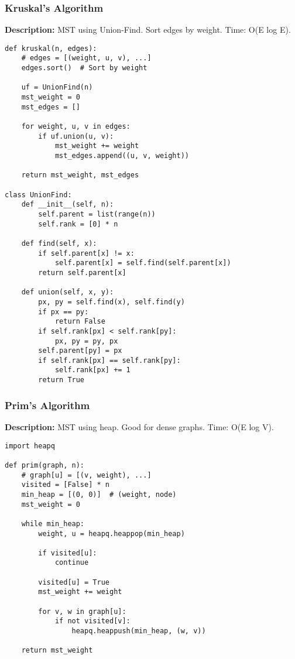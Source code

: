 \subsubsection{Kruskal's Algorithm}
\textbf{Description:} MST using Union-Find. Sort edges by weight. Time: O(E log E).

\begin{lstlisting}
def kruskal(n, edges):
    # edges = [(weight, u, v), ...]
    edges.sort()  # Sort by weight
    
    uf = UnionFind(n)
    mst_weight = 0
    mst_edges = []
    
    for weight, u, v in edges:
        if uf.union(u, v):
            mst_weight += weight
            mst_edges.append((u, v, weight))
    
    return mst_weight, mst_edges

class UnionFind:
    def __init__(self, n):
        self.parent = list(range(n))
        self.rank = [0] * n
    
    def find(self, x):
        if self.parent[x] != x:
            self.parent[x] = self.find(self.parent[x])
        return self.parent[x]
    
    def union(self, x, y):
        px, py = self.find(x), self.find(y)
        if px == py:
            return False
        if self.rank[px] < self.rank[py]:
            px, py = py, px
        self.parent[py] = px
        if self.rank[px] == self.rank[py]:
            self.rank[px] += 1
        return True
\end{lstlisting}

\subsubsection{Prim's Algorithm}
\textbf{Description:} MST using heap. Good for dense graphs. Time: O(E log V).

\begin{lstlisting}
import heapq

def prim(graph, n):
    # graph[u] = [(v, weight), ...]
    visited = [False] * n
    min_heap = [(0, 0)]  # (weight, node)
    mst_weight = 0
    
    while min_heap:
        weight, u = heapq.heappop(min_heap)
        
        if visited[u]:
            continue
        
        visited[u] = True
        mst_weight += weight
        
        for v, w in graph[u]:
            if not visited[v]:
                heapq.heappush(min_heap, (w, v))
    
    return mst_weight
\end{lstlisting}
